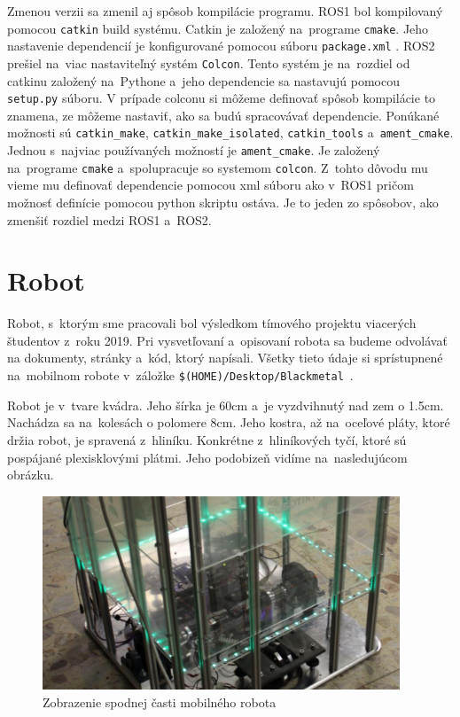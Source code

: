 	Zmenou verzii sa zmenil aj spôsob kompilácie programu. ROS1 bol kompilovaný pomocou \texttt{catkin} build systému. Catkin je založený na~programe
	\texttt{cmake}. Jeho nastavenie dependencií je konfigurované pomocou súboru \texttt{package.xml} . ROS2 prešiel na~viac nastaviteľný systém \texttt{Colcon}.
	Tento systém je na~rozdiel od catkinu založený na~Pythone a~jeho dependencie sa nastavujú pomocou \texttt{setup.py} súboru. V prípade colconu si môžeme
	definovať spôsob kompilácie to znamena, ze môžeme nastaviť, ako sa budú spracovávať dependencie. Ponúkané možnosti sú \texttt{catkin\_make},
	\texttt{catkin\_make\_isolated}, \texttt{catkin\_tools} a~\texttt{ament\_cmake}. Jednou s~najviac používaných možností je \texttt{ament\_cmake}.
	Je založený na~programe \texttt{cmake} a~spolupracuje so systemom \texttt{colcon}. Z~tohto dôvodu mu vieme mu definovať dependencie pomocou xml
	súboru ako v~ROS1 pričom možnosť definície pomocou python skriptu ostáva. Je to jeden zo spôsobov, ako zmenšiť rozdiel medzi ROS1 a~ROS2.

\section{Robot}

Robot, s~ktorým sme pracovali bol výsledkom tímového projektu viacerých študentov \newline z~roku 2019. Pri vysvetľovaní a~opisovaní robota sa budeme odvolávať
na dokumenty, stránky a~kód, ktorý napísali. Všetky tieto údaje si sprístupnené na~mobilnom robote v~záložke
\newline \texttt{\$(HOME)/Desktop/Blackmetal}~\cite{timovyProjekt}.

Robot je v~tvare kvádra. Jeho šírka je 60cm a~je vyzdvihnutý nad zem o 1.5cm. Nachádza sa na~kolesách o polomere 8cm. Jeho kostra, až na~oceľové pláty, ktoré držia robot,
je spravená z~hliníku. Konkrétne z~hliníkových tyčí, ktoré sú pospájané plexisklovými plátmi. Jeho podobizeň vidíme na~nasledujúcom obrázku. 

\begin{figure}[!htbp]
	\begin{center}
		\includegraphics[width=0.95\textwidth]{img/robot.png}
	\end{center}
	\caption{Zobrazenie spodnej časti mobilného robota~\cite{timovyProjekt}}
	\label{fig:robot}
\end{figure}

